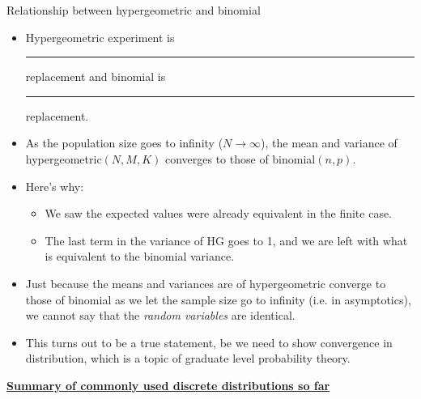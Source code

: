 \documentclass{article}
\newcommand{\bu}[1]{\textbf{\ul{#1}}}				%
\newcommand{\blankul}[1]{\rule[-1.5mm]{#1}{0.15mm}}	%
\begin{document}
Relationship between hypergeometric and binomial\bigskip
\begin{itemize}
    \item Hypergeometric experiment is \blankul{2cm} replacement and binomial is \blankul{2cm} replacement.
    \item As the population size goes to infinity ($N \to \infty$), the mean and variance of hypergeometric$(N, M, K)$ converges to those of binomial$(n, p)$.
    \item[] Here's why:
    \begin{itemize}
        \item We saw the expected values were already equivalent in the finite case.\bigskip
        \item The last term in the variance of HG goes to 1, and we are left with what is equivalent to the binomial variance.\bigskip
    \end{itemize}\bigskip
    \item[] Just because the means and variances are of hypergeometric converge to those of binomial as we let the sample size go to infinity (i.e. in asymptotics), we cannot say that the \textit{random variables} are identical.
    \item This turns out to be a true statement, be we need to show convergence in distribution, which is a topic of graduate level probability theory.
\end{itemize}\bigskip

\newpage%

\bu{Summary of commonly used discrete distributions so far}\bigskip
\end{document}
